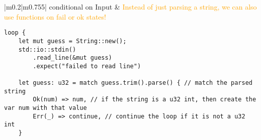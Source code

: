 \documentclass[main.tex,fontsize=8pt,paper=a4,paper=portrait,DIV=calc,]{scrartcl}
\begin{document}
\pagebreak
\begin{table}[ht!]
\begin{tabular}{|m{0.2\linewidth}|m{0.755\linewidth}|}
\hline
conditional on Input & 
\textcolor{orange}{Instead of just parsing a string,\newline
we can also use functions on fail or ok states!}\newline
\begin{lstlisting}
loop {
    let mut guess = String::new();
    std::io::stdin()
        .read_line(&mut guess)
        .expect("failed to read line")
    
    let guess: u32 = match guess.trim().parse() { // match the parsed string
        Ok(num) => num, // if the string is a u32 int, then create the var num with that value
        Err(_) => continue, // continue the loop if it is not a u32 int
    }


\end{lstlisting}
\end{tabular}
\end{table}
\end{document}
